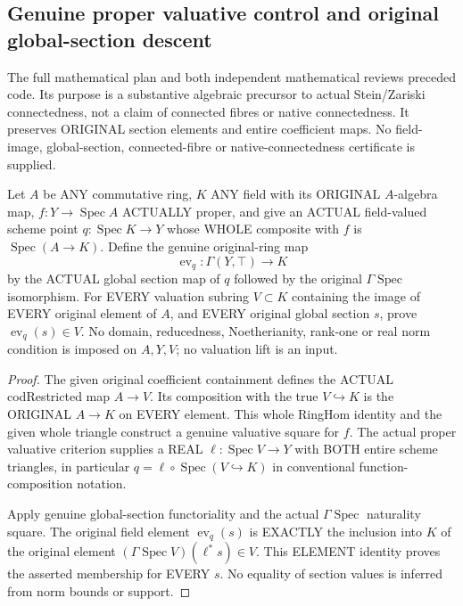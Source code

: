 \subsection{Genuine proper valuative control and original global-section descent}

The full mathematical plan and both independent mathematical reviews preceded code. Its purpose is a substantive
algebraic precursor to actual Stein/Zariski connectedness, not a claim of
connected fibres or native connectedness. It preserves ORIGINAL section
elements and entire coefficient maps. No field-image, global-section,
connected-fibre or native-connectedness certificate is supplied.

\begin{lemma}
\label{scheme:actual-proper-global-section-valuation-membership}
\leanok
{}
Let $A$ be ANY commutative ring, $K$ ANY field with its ORIGINAL
$A$-algebra map, $f:Y\to\operatorname{Spec}A$ ACTUALLY proper, and give an
ACTUAL field-valued scheme point $q:\operatorname{Spec}K\to Y$ whose WHOLE
composite with $f$ is $\operatorname{Spec}(A\to K)$. Define the genuine
original-ring map
\[
 \operatorname{ev}_q:\Gamma(Y,\top)\longrightarrow K
\]
by the ACTUAL global section map of $q$ followed by the original
$\Gamma\operatorname{Spec}$ isomorphism. For EVERY valuation subring
$V\subset K$ containing the image of EVERY original element of $A$, and
EVERY original global section $s$, prove
$\operatorname{ev}_q(s)\in V$.
No domain, reducedness, Noetherianity, rank-one or real norm condition is
imposed on $A,Y,V$; no valuation lift is an input.
\end{lemma}
\begin{proof}
The given original coefficient containment defines the ACTUAL codRestricted
map $A\to V$. Its composition with the true $V\hookrightarrow K$ is the
ORIGINAL $A\to K$ on EVERY element. This whole RingHom identity and the
given whole triangle construct a genuine valuative square for $f$.
The actual proper valuative criterion supplies a REAL
$\ell:\operatorname{Spec}V\to Y$ with BOTH entire scheme triangles, in
particular $q=\ell\circ\operatorname{Spec}(V\hookrightarrow K)$ in
conventional function-composition notation.

Apply genuine global-section functoriality and the actual
$\Gamma\operatorname{Spec}$ naturality square. The original field element
$\operatorname{ev}_q(s)$ is EXACTLY the inclusion into $K$ of the original
element $(\Gamma\operatorname{Spec}V)(\ell^*s)\in V$.
This ELEMENT identity proves the asserted membership for EVERY $s$.
No equality of section values is inferred from norm bounds or support.
\end{proof}

